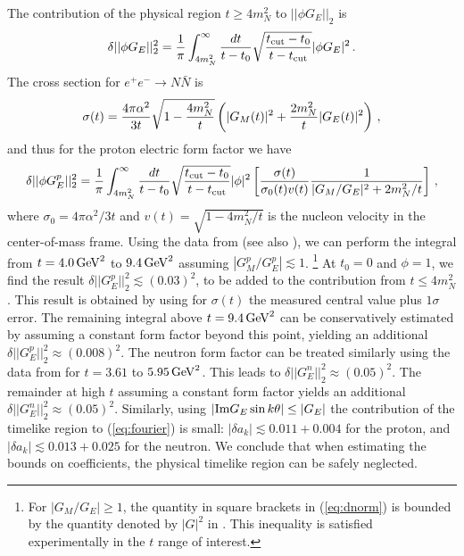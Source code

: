 \documentclass[12pt]{article}
\begin{document}
The contribution of the physical region $t\ge 4m_N^2$ to $||\phi G_E||_2$ is
\begin{align}
\delta ||\phi G_E||_2^2 = {1\over \pi} \int_{4m_N^2}^\infty {dt\over t-t_0} \sqrt{ t_{\rm cut} - t_0 \over t - t_{\rm cut}} |\phi G_E|^2 \,.
\end{align}
The cross section for $e^+ e^- \to N\bar{N}$ is~\cite{Cabibbo:1961sz}
\begin{align}
\sigma(t) = {4\pi\alpha^2\over 3 t} \sqrt{ 1 - {4m_N^2\over t}} \left( |G_M(t)|^2 + {2m_N^2\over  t} |G_E(t)|^2 \right) \,,
\end{align}
and thus for the proton electric form factor we have
\begin{align}\label{eq:dnorm}
\delta ||\phi G_E^p||_2^2 
= {1\over \pi} \int_{4m_N^2}^\infty {dt\over t-t_0} \sqrt{ t_{\rm cut} - t_0 \over t - t_{\rm cut}} 
|\phi|^2 
\left[ 
{ \sigma(t) \over \sigma_0(t) v(t) } {1\over |G_M/G_E|^2 + {2m_N^2/t}  }
\right]
\,,
\end{align}
where $\sigma_0 = 4\pi\alpha^2/3t$ and $v(t) = \sqrt{1-4m_N^2/t}$ is the nucleon velocity in the center-of-mass frame. 
Using the data from \cite{Ablikim:2005nn} (see also \cite{Pedlar:2005sj,Aubert:2005cb}), 
we can perform the integral from $t=4.0\,{\rm GeV}^2$ to $9.4\,{\rm GeV}^2$ assuming $|G_M^p/G_E^p|\lesssim 1$.%
\footnote{
For $|G_M/G_E|\ge 1$, the quantity in square brackets in (\ref{eq:dnorm}) is 
bounded by the quantity denoted by $|G|^2$ in \cite{Ablikim:2005nn}.   This inequality is 
satisfied experimentally in the $t$ range of interest. 
}
At $t_0=0$ and $\phi=1$, we find the result $\delta ||G_E^p||^2_2 \lesssim (0.03)^2$, to be added 
to the contribution from $t\le 4m_N^2$.    This result is obtained by using for $\sigma(t)$ 
the measured central value plus $1\sigma$ error.   The remaining integral above $t=9.4\,{\rm GeV}^2$ can 
be conservatively estimated by assuming a constant form factor beyond this point, yielding an 
additional $\delta ||G_E^p||_2^2 \approx (0.008)^2$.   
The neutron form factor can be treated similarly using the data from \cite{Antonelli:1998fv} for 
$t=3.61$ to $5.95\,{\rm GeV}^2$.    This leads to $\delta ||G_E^n||^2_2 \approx (0.05)^2$.  
The remainder at high $t$ assuming a constant form factor yields an additional $\delta ||G_E^n||_2^2 \approx (0.05)^2$. 
Similarly, using $|{\rm Im}G_E \sin k\theta|\le |G_E|$ the contribution of the 
timelike region to (\ref{eq:fourier}) is small: 
$|\delta a_k| \lesssim 0.011 + 0.004$ for the proton, and $|\delta a_k| \lesssim 0.013 + 0.025$ 
for the neutron.  We conclude that when estimating the bounds on coefficients, the physical timelike 
region can be safely neglected.   
\end{document}
